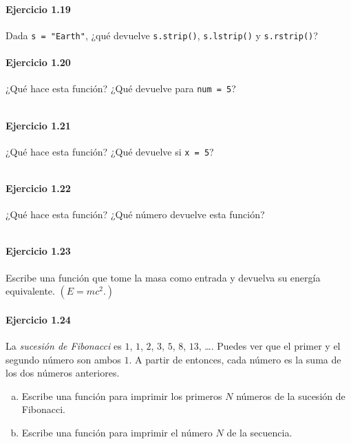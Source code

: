 \paragraph{\color{DarkBlue}Ejercicio 1.19}
Dada \texttt{s = "Earth"}, ¿qué devuelve
\texttt{s.strip()}, \texttt{s.lstrip()} y
\texttt{s.rstrip()}?

\paragraph{\color{DarkBlue}Ejercicio 1.20}
¿Qué hace esta función? ¿Qué devuelve para
\texttt{num = 5}?

\begin{listing}[ht!]
	\inputminted{python}{1.20.py}
\end{listing}

\paragraph{\color{DarkBlue}Ejercicio 1.21}
¿Qué hace esta función? ¿Qué devuelve si \texttt{x = 5}?

\begin{listing}[ht!]
	\inputminted{python}{1.21.py}
\end{listing}

\paragraph{\color{DarkBlue}Ejercicio 1.22}
¿Qué hace esta función? ¿Qué número devuelve esta función?

\begin{listing}[ht!]
	\inputminted{python}{1.22.py}
\end{listing}

\paragraph{\color{DarkBlue}Ejercicio 1.23}
Escribe una función que tome la masa como entrada y devuelva su
energía equivalente.
$\left(E = mc^{2}.\right)$

\paragraph{\color{DarkBlue}Ejercicio 1.24}
La \emph{sucesión de Fibonacci} es $1$, $1$, $2$, $3$, $5$, $8$,
$13$, \ldots.
Puedes ver que el primer y el segundo número son ambos $1$.
A partir de entonces, cada número es la suma de los dos números
anteriores.
\begin{enumerate}[(a)]
	\item

	      Escribe una función para imprimir los primeros $N$ números
	      de la sucesión de Fibonacci.

	\item

	      Escribe una función para imprimir el número $N$ de la
	      secuencia.

\end{enumerate}

